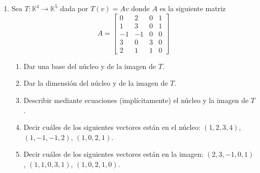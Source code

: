 \begin{enumerate}[topsep=6pt, itemsep=.4cm]
    \rta
    
    
    
    \item\label{tl-matriz} Sea $T: \mathbb{K}^4 \to \mathbb{K}^5$ dada por $T(v) = Av$ donde $A$ es la siguiente matriz
        $$
        A=\begin{bmatrix}
        0& 2& 0&1\\   1& 3& 0&1\\  -1&-1&0&0\\3&0&3&0\\2&1&1&0 \end{bmatrix}
        $$
        \begin{enumerate}[topsep=5pt,itemsep=5pt]
            \item\label{tl-matriz-a} Dar una base del núcleo y de la imagen de $T$. 
            \item\label{tl-matriz-b} Dar la dimensión del núcleo y de la imagen de $T$.
            \item\label{tl-matriz-c} Describir mediante ecuaciones (implícitamente) el núcleo y la imagen de $T$.
            \item\label{tl-matriz-d} Decir cuáles de los siguientes vectores están en el núcleo:
            $(1,2,3,4)$, $(1,-1,-1,2)$, $(1,0,2,1)$.
            \item\label{tl-matriz-e} Decir cuáles de los siguientes vectores están en la imagen:
            $(2,3,-1,0,1)$, $(1,1,0,3,1)$, $(1,0,2,1,0)$.
        \end{enumerate}
        
    \rta


\end{enumerate}
